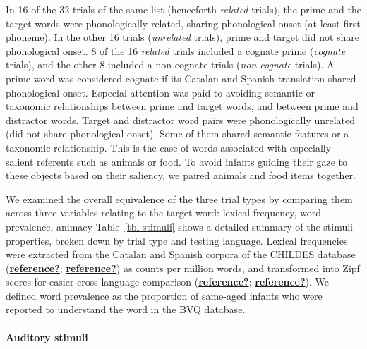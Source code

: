 \documentclass[
  letterpaper,
  DIV=11,
  numbers=noendperiod]{scrartcl}
\let\oldparagraph\paragraph
\renewcommand{\paragraph}[1]{\oldparagraph{#1}\mbox{}}
\begin{document}
In 16 of the 32 trials of the same list (henceforth \emph{related}
trials), the prime and the target words were phonologically related,
sharing phonological onset (at least first phoneme). In the other 16
trials (\emph{unrelated} trials), prime and target did not share
phonological onset. 8 of the 16 \emph{related} trials included a cognate
prime (\emph{cognate} trials), and the other 8 included a non-cognate
trials (\emph{non-cognate} trials). A prime word was considered cognate
if its Catalan and Spanish translation shared phonological onset.
Especial attention was paid to avoiding semantic or taxonomic
relationships between prime and target words, and between prime and
distractor words. Target and distractor word pairs were phonologically
unrelated (did not share phonological onset). Some of them shared
semantic features or a taxonomic relationship. This is the case of words
associated with especially salient referents such as animals or food. To
avoid infants guiding their gaze to these objects based on their
saliency, we paired animals and food items together.

We examined the overall equivalence of the three trial types by
comparing them across three variables relating to the target word:
lexical frequency, word prevalence, animacy Table~\ref{tbl-stimuli}
shows a detailed summary of the stimuli properties, broken down by trial
type and testing language. Lexical frequencies were extracted from the
Catalan and Spanish corpora of the CHILDES database
(\protect\hyperlink{ref-reference}{\textbf{reference?}};
\protect\hyperlink{ref-reference}{\textbf{reference?}}) as counts per
million words, and transformed into Zipf scores for easier
cross-language comparison
(\protect\hyperlink{ref-reference}{\textbf{reference?}};
\protect\hyperlink{ref-reference}{\textbf{reference?}}). We defined word
prevalence as the proportion of same-aged infants who were reported to
understand the word in the BVQ database.

\hypertarget{auditory-stimuli}{%
\paragraph{Auditory stimuli}\label{auditory-stimuli}}
\end{document}
